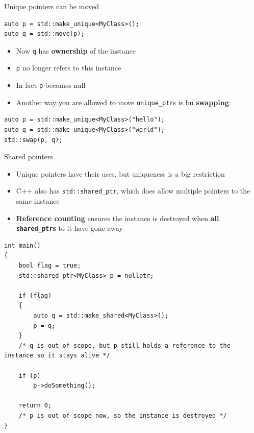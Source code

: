 \begin{frame}[fragile]{Unique pointers can be moved}
    \begin{lstlisting}
auto p = std::make_unique<MyClass>();
auto q = std::move(p);
    \end{lstlisting}
    \begin{itemize}
        \item Now \lstinline{q} has \textbf{ownership} of the instance
        \item \lstinline{p} no longer refers to this instance
        \item In fact \lstinline{p} becomes null
        \item Another way you are allowed to move \lstinline{unique_ptr}s is bu \textbf{swapping}:
    \end{itemize}
    \begin{lstlisting}
auto p = std::make_unique<MyClass>("hello");
auto q = std::make_unique<MyClass>("world");
std::swap(p, q);
    \end{lstlisting}
\end{frame}

\begin{frame}{Shared pointers}
    \begin{itemize}
        \item Unique pointers have their uses, but uniqueness is a big restriction
        \item C++ also has \lstinline{std::shared_ptr}, which does allow multiple pointers to the same
            instance
        \item \textbf{Reference counting} ensures the instance is destroyed when
            \textbf{all \lstinline{shared_ptr}s} to it have gone away
    \end{itemize}
\end{frame}

\begin{frame}[fragile]
    \begin{lstlisting}
int main()
{
	bool flag = true;
	std::shared_ptr<MyClass> p = nullptr;
	
	if (flag)
	{
		auto q = std::make_shared<MyClass>();
		p = q;
	}
    /* q is out of scope, but p still holds a reference to the instance so it stays alive */
    
    if (p)
        p->doSomething();
    
    return 0;
    /* p is out of scope now, so the instance is destroyed */
}
    \end{lstlisting}
\end{frame}


